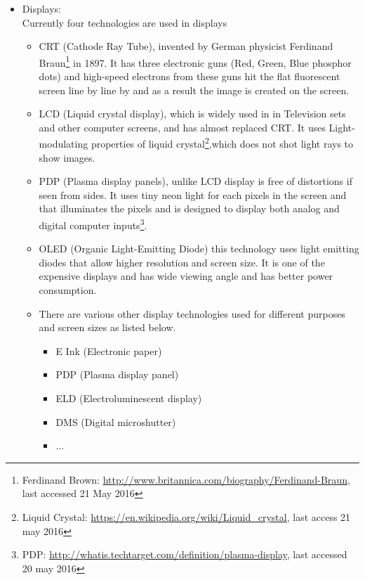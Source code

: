 \begin{itemize}

\item Displays: \\
Currently four technologies are used in displays 

\begin{itemize}
\item CRT (Cathode Ray Tube), invented by German physicist Ferdinand Braun\footnote{Ferdinand Brown: 
\url{http://www.britannica.com/biography/Ferdinand-Braun}, last accessed 21 May 2016} in 1897. It has three electronic guns (Red, Green, Blue phosphor dots) and high-speed electrons from these guns hit the flat fluorescent screen line by line by and as a result the image is created on the screen.  

\item LCD (Liquid crystal display), which is widely used in in Television sets and other computer screens, and has almost replaced CRT. It uses Light-modulating properties of liquid crystal\footnote{Liquid Crystal: \url{https://en.wikipedia.org/wiki/Liquid\_crystal}, last access 21 may 2016},which does not shot light rays to show images. 

\item PDP (Plasma display panels), unlike LCD display is free of distortions if seen from sides. It uses tiny neon light for each pixels in the screen and that illuminates the pixels and is designed to display both analog and digital computer inputs\footnote{PDP: \url{http://whatis.techtarget.com/definition/plasma-display}, last accessed 20 may 2016}.

\item OLED (Organic Light-Emitting Diode) this technology uses light emitting diodes that allow higher resolution and screen size. It is one of the expensive displays and has wide viewing angle and has better power consumption.

\item There are various other display technologies used for different purposes and screen sizes as listed below.

\begin{itemize}
\item E Ink (Electronic paper)
\item PDP (Plasma display panel)
\item ELD (Electroluminescent display)
\item DMS (Digital microshutter)
\item ...


\end{itemize}
\end{itemize}
\end{itemize}
